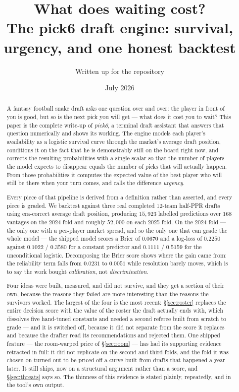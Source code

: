 \documentclass[10pt,a4paper]{article}
\title{\textbf{What does waiting cost?}\\[0.4em]
\large The pick6 draft engine: survival, urgency, and one honest backtest}
\author{Written up for the repository \code{github.com/trisslazaj/pick6}}
\date{July 2026}
\theoremstyle{plain}
\theoremstyle{definition}
\theoremstyle{remark}
\begin{document}
\maketitle

\begin{abstract}
\noindent
A fantasy football snake draft asks one question over and over: the player in front of
you is good, but so is the next pick you will get --- what does it cost you to wait?
This paper is the complete write-up of \emph{pick6}, a terminal draft assistant that
answers that question numerically and shows its working. The engine models each
player's availability as a logistic survival curve through the market's average draft
position, conditions it on the fact that he is demonstrably still on the board right
now, and corrects the resulting probabilities with a single scalar so that the number
of players the model expects to disappear equals the number of picks that will
actually happen. From those probabilities it computes the expected value of the best
player who will still be there when your turn comes, and calls the difference
\emph{urgency}.

Every piece of that pipeline is derived from a definition rather than asserted, and
every piece is graded. We backtest against three real completed 12-team half-PPR drafts
using era-correct average draft position, producing $15{,}923$ labelled predictions over
$168$ vantages on the 2024 fold and roughly $52{,}000$ on each 2025 fold. On the 2024
fold --- the only one with a per-player market spread, and so the only one that can grade
the whole model --- the shipped model scores a Brier of $0.0670$ and a log-loss of
$0.2250$ against $0.1022$ / $0.3580$ for a constant predictor and $0.1111$ / $0.5159$ for
the unconditional logistic. Decomposing the Brier score shows where the gain came from:
the reliability term falls from $0.0231$ to $0.0051$ while resolution barely moves, which
is to say the work bought \emph{calibration}, not \emph{discrimination}.

Four ideas were built, measured, and did not survive, and they get a section of their
own, because the reasons they failed are more interesting than the reasons the survivors
worked. The largest of the four is the most recent: \S\ref{sec:roster} replaces the entire
decision score with the value of the roster the draft actually ends with, which dissolves
five hand-tuned constants and needed a second referee built from scratch to grade --- and
it is switched off, because it did not separate from the score it replaces and because the
drafter read its recommendations and rejected them. One shipped feature --- the room-warped price of \S\ref{sec:room} --- has had its
supporting evidence retracted in full: it did not replicate on the second and third folds,
and the fold it was chosen on turned out to be priced off a curve built from drafts that
happened a year later. It still ships, now on a structural argument rather than a score,
and \S\ref{sec:threats} says so. The thinness of this evidence is stated plainly,
repeatedly, and in the tool's own output.
\end{abstract}
\end{document}
